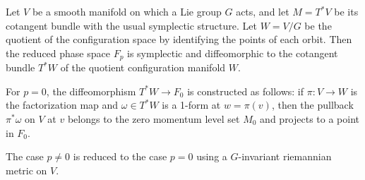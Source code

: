 Let $V$ be a smooth manifold on which a Lie group $G$ acts, and let $M = T^*V$ be its cotangent bundle with the usual symplectic structure. Let $W = V/G$ be the quotient of the configuration space by identifying the points of each orbit. Then the reduced phase space $F_p$ is symplectic and diffeomorphic to the cotangent bundle $T^*W$ of the quotient configuration manifold $W$.

For $p = 0$, the diffeomorphism $T^*W \to F_0$ is constructed as follows: if $\pi: V \to W$ is the factorization map and $\omega \in T^*W$ is a 1-form at $w = \pi(v)$, then the pullback $\pi^*\omega$ on $V$ at $v$ belongs to the zero momentum level set $M_0$ and projects to a point in $F_0$.

The case $p \neq 0$ is reduced to the case $p = 0$ using a $G$-invariant riemannian metric on $V$.
